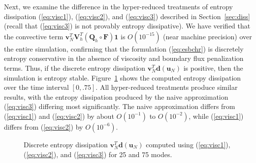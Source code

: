 \documentclass[review]{siamart171218}
\theoremstyle{assumption}
\newcommand{\LRp}[1]{\left( #1 \right)}
\begin{document}
Next, we examine the difference in the hyper-reduced treatments of entropy dissipation (\ref{eq:visc1}), (\ref{eq:visc2}), and (\ref{eq:visc3}) described in Section~\ref{sec:diss} (recall that (\ref{eq:visc3}) is not provably entropy dissipative).  We have verified that the convective term $\bm{v}_N^T \bm{V}_h^T\LRp{\bm{Q}_h \circ \bm{F}}\bm{1}$ is $O\LRp{10^{-15}}$ (near machine precision) over the entire simulation, confirming that the formulation (\ref{eq:esbchr}) is discretely entropy conservative in the absence of viscosity and boundary flux penalization terms.  Thus, if the discrete entropy dissipation $\bm{v}_N^T\bm{d}(\bm{u}_N)$ is positive, then the simulation is entropy stable.  Figure~\ref{fig:entropydiss}  shows the computed entropy dissipation over the time interval $[0,.75]$.  All hyper-reduced treatments produce similar results, with the entropy dissipation produced by the naive approximation (\ref{eq:visc3}) differing most significantly.  The naive approximation differs from (\ref{eq:visc1}) and (\ref{eq:visc2}) by about $O\LRp{10^{-1}}$ to $O\LRp{10^{-2}}$, while (\ref{eq:visc1}) differs from (\ref{eq:visc2}) by $O\LRp{10^{-6}}$.  
\begin{figure}
\centering
{}
\hspace{.5em}
\caption{Discrete entropy dissipation $\bm{v}_N^T\bm{d}(\bm{u}_N)$ computed using (\ref{eq:visc1}), (\ref{eq:visc2}), and (\ref{eq:visc3}) for 25 and 75 modes.}
\label{fig:entropydiss}
\end{figure}
\end{document}

